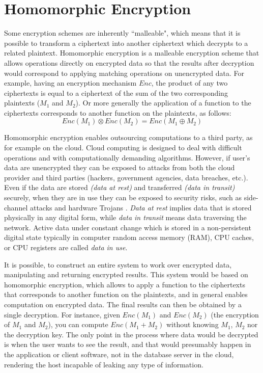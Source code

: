 \section{Homomorphic Encryption}\label{s:homomorphic-encryption}

Some encryption schemes are inherently ``malleable", which means that it is possible to transform a ciphertext into another ciphertext which decrypts to a related plaintext.
Homomorphic encryption is a malleable encryption scheme that allows operations directly on encrypted data so that the results after decryption would correspond to applying matching operations on unencrypted data.
For example, having an encryption mechanism $Enc$, the product of any two ciphertexts is equal to a ciphertext of the sum of the two corresponding plaintexts ($M_1$ and $M_2$). Or more generally the application of a function to the ciphertexts corresponds to another function on the plaintexts, as follows:
\begin{equation}\label{eq:homomorphic}
  Enc(M_1) \otimes Enc(M_2) = Enc(M_1 \oplus M_2)
\end{equation}


Homomorphic encryption enables outsourcing computations to a third party, as for example on the cloud.
Cloud computing is designed to deal with difficult operations and with computationally demanding algorithms.
However, if user's data are unencrypted they can be exposed to attacks from both the cloud provider and third parties (hackers, government agencies, data breaches, etc.).
Even if the data are stored \textit{(data at rest)} and transferred \textit{(data in transit)} securely, when they are in use they can be exposed to security risks, such as side-channel attacks \cite{zhang2012cross} and hardware Trojans \cite{becker2013stealthy, tsoutsos2014advanced}.
\textit{Data at rest} implies data that is stored physically in any digital form, while \textit{data in transit} means data traversing the network.
Active data under constant change which is stored in a non-persistent digital state typically in computer random access memory (RAM), CPU caches, or CPU registers are called \textit{data in use}.


It is possible, to construct an entire system to work over encrypted data, manipulating and returning encrypted results.
This system would be based on homomorphic encryption, which allows to apply a function to the ciphertexts that corresponds to another function on the plaintexts, and in general enables computation on encrypted data.
The final results can then be obtained by a single decryption.
For instance, given $Enc(M_1)$ and $Enc(M_2)$ (the encryption of $M_1$ and $M_2$), you can compute $Enc(M_1 + M_2)$ without knowing $M_1$, $M_2$ nor the decryption key.
The only point in the process where data would be decrypted is when the user wants to see the result, and that would presumably happen in the application or client software, not in the database server in the cloud, rendering the host incapable of leaking any type of information.


